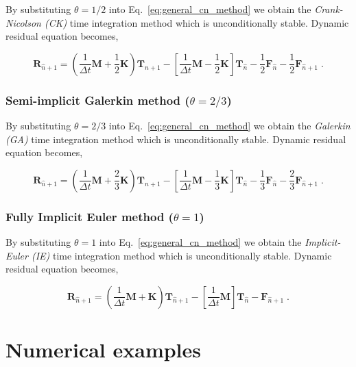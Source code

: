 \documentclass[10pt,a4paper]{article}
\begin{document}
By substituting $\theta = 1/2$ into Eq.~\eqref{eq:general_cn_method} we obtain the \textit{Crank-Nicolson (CK)} time integration method which is unconditionally stable. Dynamic residual equation becomes,

\begin{equation}
	\mathbf{R}_{\hat{n} + 1} = \left( \frac{1}{\Delta t} \mathbf{M} + \frac{1}{2} \mathbf{K} \right)\mathbf{T}_{\hat{n} + 1} - \left[ \frac{1}{\Delta t} \mathbf{M} - \frac{1}{2}\mathbf{K} \right]\mathbf{T}_{\hat{n}} - \frac{1}{2}\mathbf{F}_{\hat{n}} - \frac{1}{2}\mathbf{F}_{\hat{n} + 1} \;. 
	\label{eq:timeDeriv_crankNicolson}
\end{equation}


\subsubsection{Semi-implicit Galerkin method ($\theta = 2/3$)} \label{subsec:time_discretization_ga}

By substituting $\theta = 2/3$ into Eq.~\eqref{eq:general_cn_method} we obtain the \textit{Galerkin (GA)} time integration method which is unconditionally stable. Dynamic residual equation becomes,

\begin{equation}
	\mathbf{R}_{\hat{n} + 1} = \left( \frac{1}{\Delta t} \mathbf{M} + \frac{2}{3} \mathbf{K} \right)\mathbf{T}_{\hat{n} + 1} - \left[ \frac{1}{\Delta t} \mathbf{M} - \frac{1}{3}\mathbf{K} \right]\mathbf{T}_{\hat{n}} - \frac{1}{3}\mathbf{F}_{\hat{n}} - \frac{2}{3}\mathbf{F}_{\hat{n} + 1} \;. 
	\label{eq:timeDeriv_galerkin}
\end{equation}


\subsubsection{Fully Implicit Euler method ($\theta = 1$)} \label{subsec:time_discretization_ie}

By substituting $\theta = 1$ into Eq.~\eqref{eq:general_cn_method} we obtain the \textit{Implicit-Euler (IE)} time integration method which is unconditionally stable. Dynamic residual equation becomes,

\begin{equation}
	\mathbf{R}_{\hat{n} + 1} = \left( \frac{1}{\Delta t} \mathbf{M} + \mathbf{K} \right)\mathbf{T}_{\hat{n} + 1} - \left[ \frac{1}{\Delta t} \mathbf{M} \right]\mathbf{T}_{\hat{n}} - \mathbf{F}_{\hat{n} + 1} \;. 
	\label{eq:timeDeriv_implicitEuler}
\end{equation}



\section{Numerical examples}\label{subsec:numerical_examples}


% 


\nocite{*}
\end{document}
